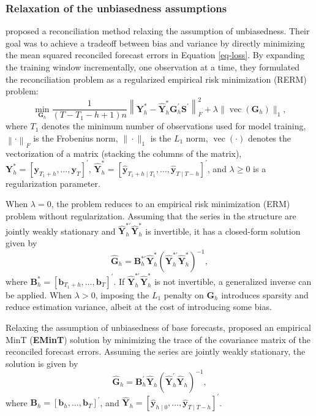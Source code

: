 \documentclass[
  11pt]{article}
\theoremstyle{plain}
\theoremstyle{remark}
\begin{document}
\subsubsection*{Relaxation of the unbiasedness
assumptions}\label{relaxation-of-the-unbiasedness-assumptions}

\citet{Ben_Taieb2019-be} proposed a reconciliation method relaxing the
assumption of unbiasedness. Their goal was to achieve a tradeoff between
bias and variance by directly minimizing the mean squared reconciled
forecast errors in Equation \eqref{eq-loss}. By expanding the training
window incrementally, one observation at a time, they formulated the
reconciliation problem as a regularized empirical risk minimization
(RERM) problem: \[
\min_{\bm{G}_h} \frac{1}{(T-T_1-h+1)n}\left\|\bm{Y}_{h}^{*}-\hat{\bm{Y}}_{h}^{*} \bm{G}_{h}^{\prime} \bm{S}^{\prime}\right\|_F^2+\lambda\|\operatorname{vec}( \bm{G}_h)\|_1,
\] where \(T_1\) denotes the minimum number of observations used for
model training, \(\left\| \cdot \right\|_F\) is the Frobenius norm,
\(\|\cdot\|_1\) is the \(L_1\) norm, \(\operatorname{vec}(\cdot)\)
denotes the vectorization of a matrix (stacking the columns of the
matrix),
\(\bm{Y}_{h}^{*}=\left[\bm{y}_{T_1+h}, \ldots, \bm{y}_T\right]^{\prime}\),
\(\hat{\bm{Y}}_{h}^{*}=\left[\hat{\bm{y}}_{T_1+h \mid T_1}, \ldots, \hat{\bm{y}}_{T \mid T-h}\right]^{\prime}\),
and \(\lambda \geq 0\) is a regularization parameter.

When \(\lambda = 0\), the problem reduces to an empirical risk
minimization (ERM) problem without regularization. Assuming that the
series in the structure are jointly weakly stationary and
\(\hat{\bm{Y}}_{h}^{*\prime}\hat{\bm{Y}}_{h}^{*}\) is invertible, it has
a closed-form solution given by \[
\hat{\bm{G}}_h = \bm{B}_{h}^{*\prime}\hat{\bm{Y}}_{h}^{*}\left(\hat{\bm{Y}}_{h}^{*\prime}\hat{\bm{Y}}_{h}^{*}\right)^{-1},
\] where
\(\bm{B}_{h}^{*}=\left[\bm{b}_{T_1+h}, \ldots, \bm{b}_T\right]^{\prime}\).
If \(\hat{\bm{Y}}_{h}^{*\prime}\hat{\bm{Y}}_{h}^{*}\) is not invertible,
a generalized inverse can be applied. When \(\lambda > 0\), imposing the
\(L_1\) penalty on \(\bm{G}_h\) introduces sparsity and reduce
estimation variance, albeit at the cost of introducing some bias.

Relaxing the assumption of unbiasedness of base forecasts,
\citet{Wickramasuriya2021-am} proposed an empirical MinT
(\textbf{EMinT}) solution by minimizing the trace of the covariance
matrix of the reconciled forecast errors. Assuming the series are
jointly weakly stationary, the solution is given by \[
\hat{\bm{G}}_{h} = \bm{B}_{h}^{\prime}\hat{\bm{Y}}_{h}\left(\hat{\bm{Y}}_{h}^{\prime}\hat{\bm{Y}}_{h}\right)^{-1},
\] where
\(\bm{B}_{h}=\left[\bm{b}_{h}, \ldots, \bm{b}_T\right]^{\prime}\), and
\(\hat{\bm{Y}}_{h}=\left[\hat{\bm{y}}_{h \mid 0}, \ldots, \hat{\bm{y}}_{T \mid T-h}\right]^{\prime}\).
\end{document}
